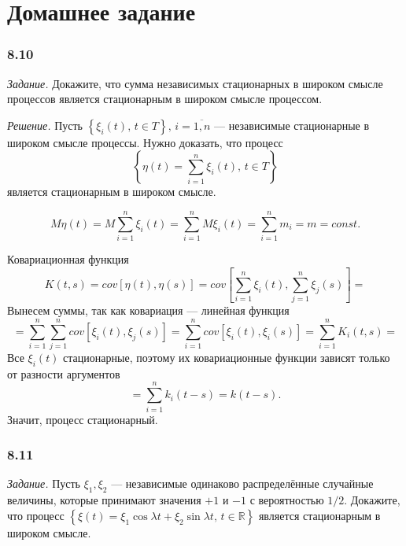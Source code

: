 \section*{Домашнее задание}

\subsubsection*{8.10}

\textit{Задание.}
Докажите, что сумма независимых стационарных в широком смысле процессов является стационарным в
широком смысле процессом.

\textit{Решение.}
Пусть $ \left\{ \xi_i \left( t \right), \, t \in T \right\}, \, i = \overline{1, n}$ ---
независимые стационарные в широком смысле процессы.
Нужно доказать, что процесс
$$ \left\{
  \eta \left( t \right) = \sum \limits_{i = 1}^n \xi_i \left( t \right), \, t \in T \right\} $$
является стационарным в широком смысле.

$$M \eta \left( t \right) =
  M \sum \limits_{i = 1}^n \xi_i \left( t \right) =
  \sum \limits_{i = 1}^n M \xi_i \left( t \right) =
  \sum \limits_{i = 1}^n m_i =
  m =
  const.$$

Ковариационная функция
$$K \left( t, s \right) =
  cov \left[ \eta \left( t \right), \eta \left( s \right) \right] =
  cov \left[
    \sum \limits_{i = 1}^n \xi_i \left( t \right), \sum \limits_{j = 1}^n \xi_j \left( s \right)
  \right] =$$
Вынесем суммы, так как ковариация --- линейная функция
$$= \sum \limits_{i = 1}^n
    \sum \limits_{j = 1}^n cov \left[ \xi_i \left( t \right), \xi_j \left( s \right) \right] =
  \sum \limits_{i = 1}^n cov \left[ \xi_i \left( t \right), \xi_i \left( s \right) \right] =
  \sum \limits_{i = 1}^n K_i \left( t, s \right) =$$
Все $ \xi_i \left( t \right) $ стационарные,
поэтому их ковариационные функции зависят только от разности аргументов
$$= \sum \limits_{i = 1}^n k_i \left( t - s \right) =
  k \left( t - s \right).$$
Значит, процесс стационарный.

\subsubsection*{8.11}

\textit{Задание.}
Пусть $ \xi_1, \xi_2$ --- независимые одинаково распределённые случайные величины,
которые принимают значения $+1$ и $-1$ с вероятностью $1 / 2$.
Докажите, что процесс
$ \left\{
  \xi \left( t \right) = \xi_1 \cos \lambda t + \xi_2 \sin \lambda t, \, t \in \mathbb{R} \right\} $
является стационарным в широком смысле.

